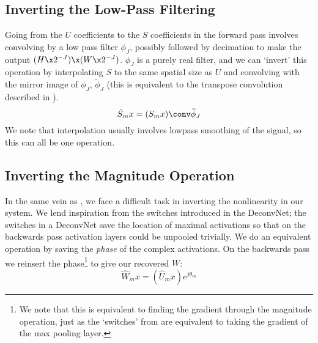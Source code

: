 \subsection{Inverting the Low-Pass Filtering}
Going from the $U$ coefficients to the $S$ coefficients in the forward pass involves convolving by
a low pass filter $\phi_J$, possibly followed by decimation to make the output $(H\x
2^{-J})\x (W\x2^{-J})$.  $\phi_J$ is a purely real filter, and we can `invert'
this operation by interpolating $S$ to the same spatial size as $U$ and convolving with
the mirror image of $\phi_J$, $\widetilde{\phi}_J$ (this is equivalent to the
transpose convolution described in \cite{zeiler_visualizing_2014}).
\begin{equation}
  \label{eq:ch4:s_hat}
  \hat{S}_{m}x = (S_{m}x) \conv \widetilde{\phi}_J
\end{equation}
We note that
interpolation usually involves lowpass smoothing of the signal, so this can all
be one operation.

\subsection{Inverting the Magnitude Operation}
In the same vein as \cite{zeiler_visualizing_2014}, we face a difficult
task in inverting the nonlinearity in our system.
We lend inspiration from the switches introduced in the DeconvNet; the
switches in a DeconvNet save the location of maximal activations so that
on the backwards pass activation layers could be unpooled trivially. We do an
equivalent operation by saving the \emph{phase} of the complex activations.
On the backwards pass we reinsert the phase\footnote{We note that this is equivalent 
to finding the gradient through the magnitude operation, just as the `switches' 
from \cite{zeiler_visualizing_2014} are equivalent to taking the gradient of 
the max pooling layer.} to give our recovered $W$:
\begin{equation}
  \label{eq:ch4:w_hat}
  \hat{W}_{m}x = \left(\hat{U}_{m} x\right) e^{j\theta_{m}}
\end{equation}

